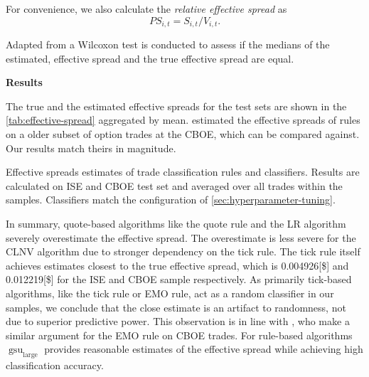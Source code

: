 For convenience, we also calculate the \emph{relative effective spread} as
\begin{equation}
    {PS}_{i,t} = S_{i,t} / V_{i,t}.
\end{equation}

Adapted from \textcite[][12]{theissenTestAccuracyLee2000} a Wilcoxon test is conducted to assess if the medians of the estimated, effective spread and the true effective spread are equal.

\textbf{Results}

The true and the estimated effective spreads for the test sets are shown in the \cref{tab:effective-spread} aggregated by mean. \textcite[][896--897]{savickasInferringDirectionOption2003} estimated the effective spreads of rules on a older subset of option trades at the \gls{CBOE}, which can be compared against. Our results match theirs in magnitude.

\begin{table}[!ht]
    \centering
    
    \caption[Effective Spreads Estimates]{Effective spreads estimates of trade classification rules and classifiers. Results are calculated on \gls{ISE} and \gls{CBOE} test set and averaged over all trades within the samples. Classifiers match the configuration of \cref{sec:hyperparameter-tuning}.}
    \label{tab:effective-spread}
\end{table}

In summary, quote-based algorithms like the quote rule and the \gls{LR} algorithm severely overestimate the effective spread. The overestimate is less severe for the \gls{CLNV} algorithm due to stronger dependency on the tick rule. The tick rule itself achieves estimates closest to the true effective spread, which is \num[round-mode=places, round-precision=3]{0.004926}[\$]{} and \num[round-mode=places, round-precision=3]{0.012219}[\$]{} for the \gls{ISE} and \gls{CBOE} sample respectively. As primarily tick-based algorithms, like the tick rule or \gls{EMO} rule, act as a random classifier in our samples, we conclude that the close estimate is an artifact to randomness, not due to superior predictive power. This observation is in line with \textcite[][897]{savickasInferringDirectionOption2003}, who make a similar argument for the \gls{EMO} rule on \gls{CBOE} trades. For rule-based algorithms $\operatorname{gsu}_{\mathrm{large}}$ provides reasonable estimates of the effective spread while achieving high classification accuracy.


